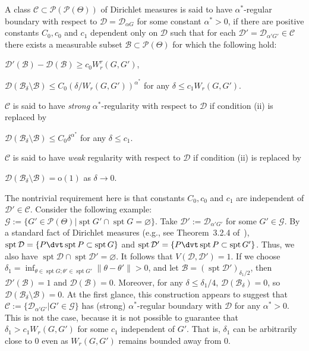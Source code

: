 \documentclass[MSNbibl,number,citesort]{arxbj}
\newcommand{\Dcal}{\mathcal{D}}
\newcommand{\Pcal}{\mathscr{P}}
\newcommand{\Gcal}{\mathscr{G}}
\newcommand{\BB}{\mathscr{B}}
\newcommand{\supp}{\operatorname{spt}}
\newcommand{\DP}{\mathscr{D}}
\newcommand{\Cclass}{\mathscr{C}}
\newcommand{\Wr}{W_r}
\begin{document}
%
\begin{definition}
\label{Def-margin}
A class $\Cclass\subset\Pcal(\Pcal(\Theta))$ of Dirichlet measures
is said to have ${\alpha^*}$-regular boundary with respect to $\Dcal
= \DP_{\alpha G}$ for some constant ${\alpha^*}> 0$, if
there are positive constants $C_0, c_0$ and $c_1$ dependent only on
$\Dcal$ such that
for each $\Dcal' = \DP_{\alpha' G'} \in\Cclass$
there exists a measurable subset
$\BB\subset\Pcal(\Theta)$ for which the following hold:
%
\begin{longlist}[(iii)]
%
\item[(i)] $\Dcal'(\BB) - \Dcal(\BB) \geq c_0 \Wr^r(G,G')$,
%
\item[(ii)] $\Dcal(\BB_\delta\setminus\BB) \leq C_0
(\delta
/\Wr(G,G')
)^{\alpha^*}$ for any $\delta\leq c_1 \Wr(G,G')$.
\end{longlist}
%
$\Cclass$ is said to have \emph{strong}
${\alpha^*}$-regularity with respect to $\Dcal$ if condition \textup{(ii)} is
replaced by
%
\begin{longlist}[(iii)]
%
\item[(iii)] $\Dcal(\BB_\delta\setminus\BB) \leq C_0 \delta
^{\alpha^*}$ for
any $\delta\leq c_1$.
\end{longlist}
%
$\Cclass$ is said to have \emph{weak} regularity with respect to
$\Dcal
$ if
condition \textup{(ii)} is replaced by
%
\begin{longlist}[(iv)]
%
\item[(iv)] $\Dcal(\BB_\delta\setminus\BB) = \mathrm{o}(1)$ as
$\delta
\rightarrow0$.
\end{longlist}
%
\end{definition}

\begin{remark*} The nontrivial requirement here is that
constants $C_0, c_0$ and $c_1$ are independent of $\Dcal' \in\Cclass$.
Consider the following example: $\Gcal:= \{G' \in\Pcal(\Theta)|
\supp G' \cap\supp G = \varnothing\}$. Take $\Dcal' := \DP_{\alpha
' G'}$
for some $G' \in\Gcal$.
By a standard fact of Dirichlet measures
(e.g., see Theorem~3.2.4 of~\cite{Ghosh-Ramamoorthi-02}),
$\supp\Dcal= \{P\dvt\supp P \subset\supp G\}$ and
$\supp\Dcal' = \{P\dvt\supp P \subset\supp G'\}$. Thus, we
also have $\supp\Dcal\cap\supp\Dcal' = \varnothing$.
It follows that $V(\Dcal, \Dcal') = 1$. If we choose
$\delta_1 = \inf_{\theta\in\supp G; \theta' \in\supp G'} \|\theta-
\theta'\|
> 0$, and let $\BB= (\supp\Dcal')_{\delta_1/2}$,
then $\Dcal'(\BB) = 1$ and $\Dcal(\BB) = 0$. Moreover,
for any $\delta\leq\delta_1/4$, $\Dcal(\BB_\delta) = 0$, so
$\Dcal(\BB_\delta\setminus\BB) = 0$. At the first glance,
this construction appears to suggest that
$\Cclass:= \{\DP_{\alpha' G'}| G' \in\Gcal\}$
has (strong) ${\alpha^*}$-regular boundary with $\Dcal$
for any ${\alpha^*}> 0$. This is not the case,
because it is not possible to guarantee that $\delta_1 > c_1 \Wr(G,G')$
for some $c_1$ independent of $G'$. That is,
$\delta_1$ can be arbitrarily close to 0
even as $\Wr(G,G')$ remains bounded away from 0.
\end{remark*}
\end{document}
